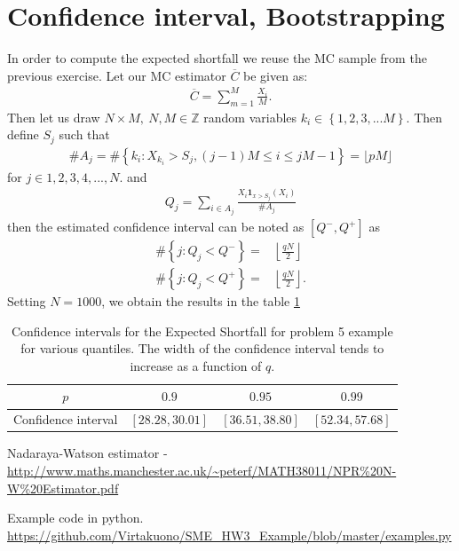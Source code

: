 \documentclass[a4paper,11pt]{article}
\newcommand{\parent}[1]{\left( {#1} \right)}
\newcommand{\sset}[1]{\left\lbrace {#1} \right\rbrace }
\newcommand{\ssum}[2]{\displaystyle\sum\limits_{#1}^{#2}}
\begin{document}
\section*{Confidence interval, Bootstrapping}

In order to compute the expected shortfall we reuse the MC sample from the previous exercise.
Let our MC estimator $\overline C$ be given as:
\begin{align}
\overline C = \ssum{m=1}{M} \frac{X_i}{M}.
\end{align}
Then let us draw $N\times M, ~ N,M \in \mathbb Z$ random variables
$k_i \in \sset{1,2,3,...M}$. Then define $S_j$ such that
\begin{align}
\# A_j =\# \sset{k_i: X_{k_i}>S_j, \parent{j-1 }M \leq i \leq jM-1} = \lfloor pM \rfloor
\end{align}
for $j \in {1,2,3,4,...,N}$. and
\begin{align}
Q _j = \ssum{i \in A_j}{} \frac{X_i \mathbf{1}_{x>S_j} \parent{X_i}}{\# A_j}
\end{align}
then the estimated confidence interval can be noted as $[Q^-,Q^+]$
as
\begin{align}
\# \sset{j: Q_j<Q^{-}} =& \left \lfloor \frac{qN}{2} \right \rfloor \\
\# \sset{j: Q_j<Q^{+}} =&  \left \lfloor \frac{qN}{2} \right \rfloor .
\end{align}
Setting $N=1000$, we obtain the results in the table \ref{tb:BS}

\begin{table}	
\begin{center}
\begin{tabular}{c c c c }
  $p$ & $0.9$  & $0.95$  &  $0.99$ \\
  \hline
Confidence interval & $[28.28, 30.01]$ & $[36.51, 38.80]$ & $[52.34, 57.68]$ 
\end{tabular}
\end{center}
\caption{\label{tb:BS}
Confidence intervals for the Expected Shortfall for problem 5 example
for various quantiles.
The width of the confidence interval tends to increase as a function of $q$.	
}
\end{table}

\begin{thebibliography}{9}

 Nadaraya-Watson estimator - \url{http://www.maths.manchester.ac.uk/~peterf/MATH38011/NPR\%20N-W\%20Estimator.pdf}

 Example code in python. \url{https://github.com/Virtakuono/SME_HW3_Example/blob/master/examples.py}
\end{thebibliography}
\end{document}
